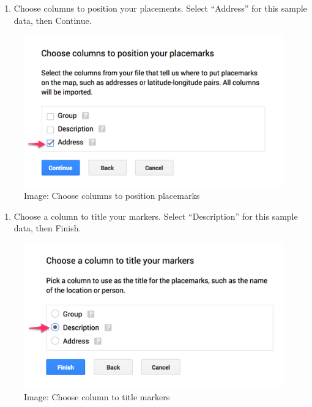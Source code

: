 \documentclass[
  english,
]{book}
\providecommand{\tightlist}{%
  \setlength{\itemsep}{0pt}\setlength{\parskip}{0pt}}
\begin{document}
\begin{enumerate}
\def\labelenumi{\arabic{enumi})}
\setcounter{enumi}{4}
\tightlist
\item
  Choose columns to position your placements. Select ``Address'' for this sample data, then Continue.
\end{enumerate}

\begin{figure}
\centering
\includegraphics{images/06-map/mymaps-choose-position.png}
\caption{Image: Choose columns to position placemarks}
\end{figure}

\begin{enumerate}
\def\labelenumi{\arabic{enumi})}
\setcounter{enumi}{5}
\tightlist
\item
  Choose a column to title your markers. Select ``Description'' for this sample data, then Finish.
\end{enumerate}

\begin{figure}
\centering
\includegraphics{images/06-map/mymaps-choose-title.png}
\caption{Image: Choose column to title markers}
\end{figure}
\end{document}
